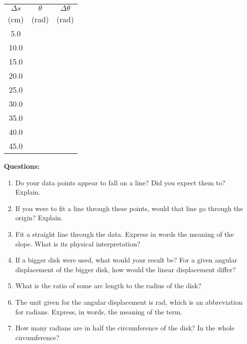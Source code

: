 \begin{center}  \setlength{\unitlength}{1mm} \begin{tabular}{|c|c|c|} \hline $\Delta s$ & $\theta$ & $\Delta\theta$ \\ (cm) & (rad) & (rad) \\ \hline \hline 5.0&& \\ \hline 10.0&& \\ \hline 15.0&& \\ \hline 20.0&& \\ \hline 25.0&& \\ \hline 30.0&& \\ \hline 35.0&& \\ \hline 40.0&& \\ \hline 45.0&& \\ \hline \end{tabular} \end{center}

\smallskip

{\noindent \bf Questions:}

\begin{enumerate}
\item Do your data points appear to fall on a line? Did you expect them to? Explain. \vspace{15mm}

\item If you were to fit a line through these points, would that line go through the
origin? Explain. \vspace{15mm}

\item Fit a straight line through the data. Express in words the meaning of 
the slope. What is its physical interpretation? \vspace{15mm}

\item If a bigger disk were used, what would your result be? For a given angular displacement
of the bigger disk, how would the linear displacement differ? \vspace{15mm}

\item What is the ratio of some arc length to the radius of the disk? \vspace{15mm}

\item The unit given for the angular displacement is rad, which is an abbreviation
for radians. Express, in words, the meaning of the term. \vspace{15mm}

\item How many radians are in half the circumference of the disk? In the whole circumference?
\end{enumerate}
